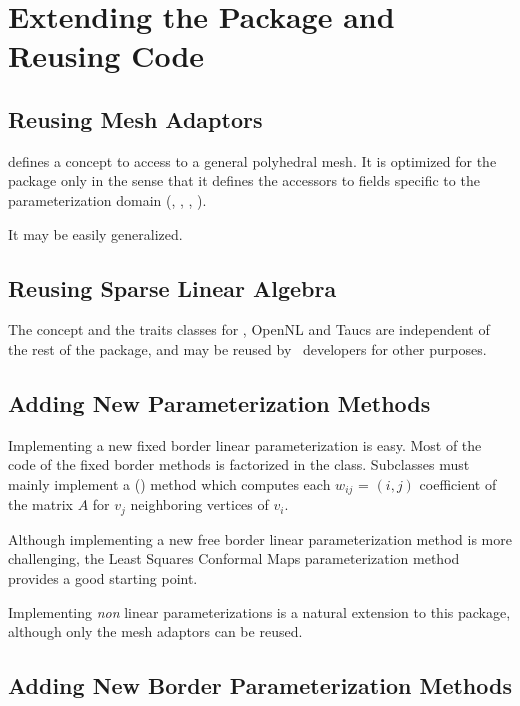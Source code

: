 \section{Extending the Package and Reusing Code}

\subsection{Reusing Mesh Adaptors}

 defines a concept to access to a
general polyhedral mesh.
It is optimized for the  package
only in the sense that it
defines the accessors to fields specific to the parameterization domain
(, , , ).

It may be easily generalized.


\subsection{Reusing Sparse Linear Algebra}

The  concept and the traits classes
for \eigen, OpenNL and {\sc Taucs} are independent of the rest of the
 package, and may be reused by
\cgal\ developers for other purposes.


\subsection{Adding New Parameterization Methods}

Implementing a new fixed border linear parameterization is easy.  Most
of the code of the fixed border methods is factorized in the
class.  Subclasses must mainly
implement a () method which computes each
$w_{ij}$ = $(i, j)$ coefficient of the matrix $A$ for $v_j$ neighboring
vertices of $v_i$.

Although implementing a new free border linear parameterization
method is more challenging, the Least Squares Conformal Maps
parameterization method provides a good starting point.

Implementing \emph{non} linear parameterizations is a natural extension
to this package, although only the mesh adaptors can be reused.


\subsection{Adding New Border Parameterization Methods}

